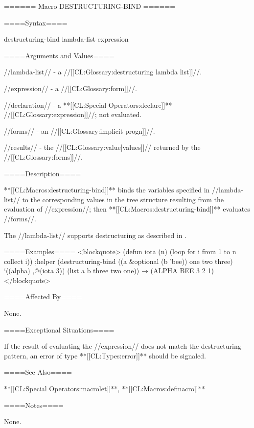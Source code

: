 ====== Macro DESTRUCTURING-BIND ======


====Syntax====

\DefmacWithValuesNewline destructuring-bind {lambda-list expression  } {}

====Arguments and Values====


//lambda-list// - a //[[CL:Glossary:destructuring lambda list]]//.

//expression// - a //[[CL:Glossary:form]]//.

//declaration// - a **[[CL:Special Operators:declare]]** //[[CL:Glossary:expression]]//; not evaluated.

//forms// - an //[[CL:Glossary:implicit progn]]//.

//results// - the //[[CL:Glossary:value|values]]// returned by the //[[CL:Glossary:forms]]//.

====Description====

**[[CL:Macros:destructuring-bind]]** binds the variables specified in //lambda-list// to the corresponding values in the tree structure resulting from the evaluation of //expression//; then **[[CL:Macros:destructuring-bind]]** evaluates //forms//.


The //lambda-list// supports destructuring as described in \secref\DestructuringLambdaLists.

====Examples==== <blockquote> (defun iota (n) (loop for i from 1 to n collect i)) ;helper (destructuring-bind ((a &optional (b 'bee)) one two three) `((alpha) ,@(iota 3)) (list a b three two one)) → (ALPHA BEE 3 2 1) </blockquote>


====Affected By====

None.

====Exceptional Situations====

If the result of evaluating the //expression// does not match the destructuring pattern, an error of type **[[CL:Types:error]]** should be signaled.

====See Also====

**[[CL:Special Operators:macrolet]]**, **[[CL:Macros:defmacro]]**

====Notes====

None.


 
